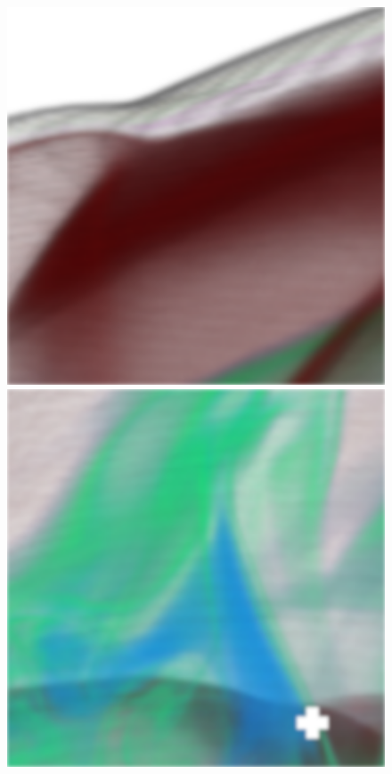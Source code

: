 \begin{figure}[]
	\centering
	\begin{minipage}[t]{0.3\textwidth}
		\centering
		\includegraphics[width=1\textwidth]{../../Neue_Messungen/Supernova/cut/st_ors/st_ors_1.png}
	\end{minipage}
	\hfill
	\begin{minipage}[t]{0.3\textwidth}
		\centering
		\includegraphics[width=1\textwidth]{../../Neue_Messungen/Supernova/cut/st_ors/st_ors_2.png}

\end{minipage}
\end{figure}
